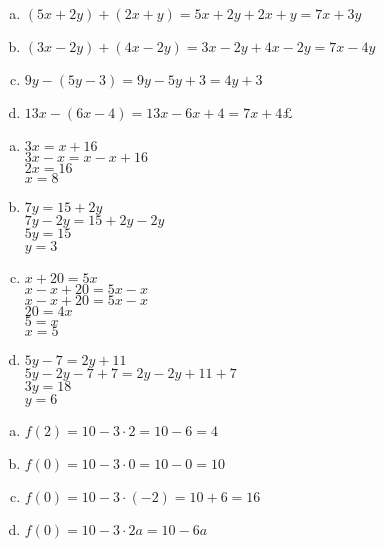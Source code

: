 \documentclass {article}
\begin{document}
\begin{enumerate}[a)]
\item $(5x + 2y) + (2x + y) = 5x + 2y + 2x + y = 7x + 3y$
\item $(3x - 2y) + (4x - 2y) = 3x - 2y + 4x - 2y = 7x - 4y$
\item $9y - (5y - 3) = 9y - 5y + 3 = 4y + 3$
\item $13x - (6x - 4) = 13x - 6x + 4 = 7x + 4£$ 
\end{enumerate}

\begin{enumerate}[a)]
\item $3x = x + 16$\\
$3x - x = x - x+ 16$\\
$2x  = 16$\\
$x  = 8$
\item $7y = 15 + 2y$\\
$7y -2y = 15 + 2y - 2y$\\
$5y = 15$\\
$y = 3$
\item $x + 20 = 5x$\\
$x - x + 20 = 5x -x$\\
$x - x + 20 = 5x -x$\\
$20 = 4x$\\
$5 = x$\\
$x = 5$
\item $5y - 7 = 2y + 11$\\
$5y - 2y - 7  + 7 = 2y - 2y + 11 + 7$\\
$3y = 18$\\
$y = 6$\\ 
\end{enumerate} 

\begin{enumerate}[a)]
\item $f(2) = 10 - 3 \cdot 2 = 10 - 6 = 4$
\item $f(0) = 10 - 3 \cdot 0 = 10 - 0 = 10$
\item $f(0) = 10 - 3 \cdot (-2) = 10 + 6 = 16$
\item $f(0) = 10 - 3 \cdot 2a = 10 - 6a$
\end{enumerate} 
\end{document}
